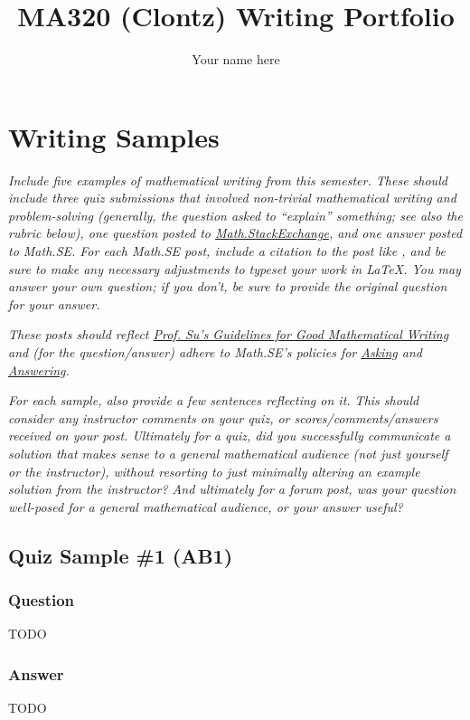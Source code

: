 \documentclass{article}
\title{MA320 (Clontz) Writing Portfolio}
\author{Your name here}
\begin{document}
\maketitle

\section{Writing Samples}
\textit{Include five examples of mathematical writing
from this semester. These should include three quiz submissions
that involved non-trivial mathematical writing and problem-solving 
(generally, the question asked to ``explain'' something; see also
the rubric below), one question posted to
\href{https://math.stackexchange.com/}{Math.StackExchange},
and one answer posted to Math.SE.
For each Math.SE post, include
a citation to the post like \cite{1089984},
and be sure to make any necessary adjustments to
typeset your work in LaTeX. You may answer your own question;
if you don't, be sure to provide the original question for your
answer.}

\textit{These posts should reflect
\href{https://usaonline.southalabama.edu/courses/35295/files/6197333?wrap=1}
{Prof. Su's Guidelines for Good Mathematical Writing}
and (for the question/answer) adhere to Math.SE's policies for
\href{https://math.stackexchange.com/help/asking}
{Asking}
and
\href{https://math.stackexchange.com/help/answering}
{Answering}.}

\textit{For each sample, also provide a few sentences reflecting on it.
This should consider any instructor comments on your quiz,
or scores/comments/answers received on your post.
Ultimately for a quiz, did you successfully communicate a solution
that makes sense to a general mathematical audience (not just yourself
or the instructor), without resorting to just minimally altering an
example solution from the instructor? And ultimately for a forum post,
was your question well-posed for a general mathematical audience,
or your answer useful?}

\subsection{Quiz Sample \#1 (AB1)}
\subsubsection*{Question}
TODO

\subsubsection*{Answer}
TODO
\end{document}
